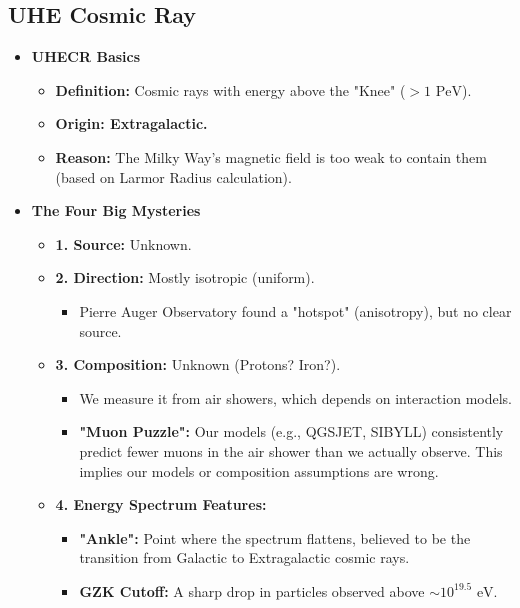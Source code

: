 \documentclass{sciposter}
\begin{document}
\begin{multicols}{3}
\section{UHE Cosmic Ray}

\begin{itemize}
    \item \textbf{UHECR Basics}
    \begin{itemize}
        \item \textbf{Definition:} Cosmic rays with energy above the "Knee" ($> 1 \text{ PeV}$).
        \item \textbf{Origin: Extragalactic.}
        \item \textbf{Reason:} The Milky Way's magnetic field is too weak to contain them (based on Larmor Radius calculation).
    \end{itemize}

    \item \textbf{The Four Big Mysteries}
    \begin{itemize}
        \item \textbf{1. Source:} Unknown.
        \item \textbf{2. Direction:} Mostly isotropic (uniform).
            \begin{itemize}
                \item Pierre Auger Observatory found a "hotspot" (anisotropy), but no clear source.
            \end{itemize}
        \item \textbf{3. Composition:} Unknown (Protons? Iron?).
            \begin{itemize}
                \item We measure it from air showers, which depends on interaction models.
                \item \textbf{"Muon Puzzle":} Our models (e.g., QGSJET, SIBYLL) consistently predict fewer muons in the air shower than we actually observe. This implies our models or composition assumptions are wrong.
            \end{itemize}
        \item \textbf{4. Energy Spectrum Features:}
            \begin{itemize}
                \item \textbf{"Ankle":} Point where the spectrum flattens, believed to be the transition from Galactic to Extragalactic cosmic rays.
                \item \textbf{GZK Cutoff:} A sharp drop in particles observed above $\sim 10^{19.5} \text{ eV}$.
            \end{itemize}
    \end{itemize}


\end{itemize}
\end{multicols}
\end{document}
